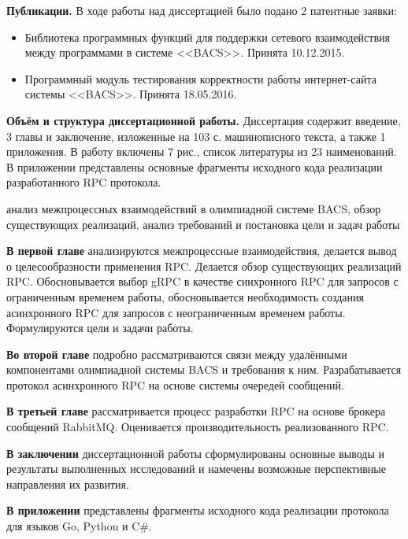 
\textbf{Публикации.} В ходе работы над диссертацией было подано 2 патентные
заявки:
\begin{itemize}
    \item Библиотека программных функций для поддержки сетевого взаимодействия
        между программами в системе <<BACS>>. Принята 10.12.2015.
    \item Программный модуль тестирования корректности работы интернет-сайта
        системы <<BACS>>. Принята 18.05.2016.
\end{itemize}

\textbf{Объём и структура диссертационной работы.} Диссертация содержит
введение, 3 главы и заключение, изложенные на 103 с. машинописного текста,
а также 1 приложения. В работу включены 7 рис., список литературы из 23
наименований. В приложении представлены основные фрагменты исходного кода
реализации разработанного RPC протокола.

анализ межпроцессных взаимодействий
в олимпиадной системе BACS, обзор существующих реализаций,
анализ требований и постановка цели и задач работы

\textbf{В первой главе} анализируются межпроцессные взаимодействия,
делается вывод о целесообразности применения RPC. Делается обзор
существующих реализаций RPC. Обосновывается выбор gRPC в качестве
синхронного RPC для запросов с ограниченным временем работы,
обосновывается необходимость создания асинхронного RPC для запросов
с неограниченным временем работы. Формулируются цели и задачи работы.

\textbf{Во второй главе} подробно рассматриваются связи между удалёнными
компонентами олимпиадной системы BACS и требования к ним. Разрабатывается
протокол асинхронного RPC на основе системы очередей сообщений.

\textbf{В третьей главе} рассматривается процесс разработки RPC на основе
брокера сообщений RabbitMQ. Оценивается производительность реализованного RPC.

\textbf{В заключении} диссертационной работы сформулированы основные выводы
и результаты выполненных исследований и намечены возможные перспективные
направления их развития.

\textbf{В приложении} представлены фрагменты исходного кода реализации
протокола для языков Go, Python и C\#.

